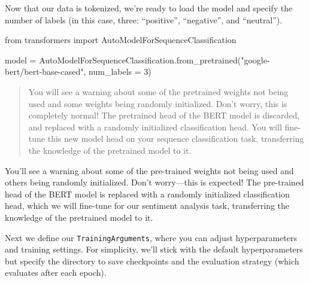 \documentclass[
  letterpaper,
  DIV=11,
  numbers=noendperiod]{scrreprt}
\newenvironment{Shaded}{\begin{snugshade}}{\end{snugshade}}
\newcommand{\DecValTok}[1]{\textcolor[rgb]{0.68,0.00,0.00}{#1}}
\newcommand{\ImportTok}[1]{\textcolor[rgb]{0.00,0.46,0.62}{#1}}
\newcommand{\NormalTok}[1]{\textcolor[rgb]{0.00,0.23,0.31}{#1}}
\newcommand{\OperatorTok}[1]{\textcolor[rgb]{0.37,0.37,0.37}{#1}}
\newcommand{\StringTok}[1]{\textcolor[rgb]{0.13,0.47,0.30}{#1}}
\begin{document}
Now that our data is tokenized, we're ready to load the model and
specify the number of labels (in this case, three: ``positive'',
``negative'', and ``neutral'').

\begin{Shaded}
\begin{Highlighting}[]
\ImportTok{from}\NormalTok{ transformers }\ImportTok{import}\NormalTok{ AutoModelForSequenceClassification}

\NormalTok{model }\OperatorTok{=}\NormalTok{ AutoModelForSequenceClassification.from\_pretrained(}\StringTok{"google{-}bert/bert{-}base{-}cased"}\NormalTok{, num\_labels }\OperatorTok{=} \DecValTok{3}\NormalTok{)}
\end{Highlighting}
\end{Shaded}

\begin{quote}
You will see a warning about some of the pretrained weights not being
used and some weights being randomly initialized. Don't worry, this is
completely normal! The pretrained head of the BERT model is discarded,
and replaced with a randomly initialized classification head. You will
fine-tune this new model head on your sequence classification task,
transferring the knowledge of the pretrained model to it.
\end{quote}

\begin{tcolorbox}[enhanced jigsaw, opacitybacktitle=0.6, breakable, title=\textcolor{quarto-callout-note-color}{\faInfo}\hspace{0.5em}{Note}, arc=.35mm, colframe=quarto-callout-note-color-frame, colbacktitle=quarto-callout-note-color!10!white, left=2mm, bottomrule=.15mm, opacityback=0, toprule=.15mm, bottomtitle=1mm, toptitle=1mm, titlerule=0mm, leftrule=.75mm, colback=white, rightrule=.15mm, coltitle=black]

You'll see a warning about some of the pre-trained weights not being
used and others being randomly initialized. Don't worry---this is
expected! The pre-trained head of the BERT model is replaced with a
randomly initialized classification head, which we will fine-tune for
our sentiment analysis task, transferring the knowledge of the
pretrained model to it.

\end{tcolorbox}

Next we define our \texttt{TrainingArguments}, where you can adjust
hyperparameters and training settings. For simplicity, we'll stick with
the default hyperparameters but specify the directory to save
checkpoints and the evaluation strategy (which evaluates after each
epoch).
\end{document}
